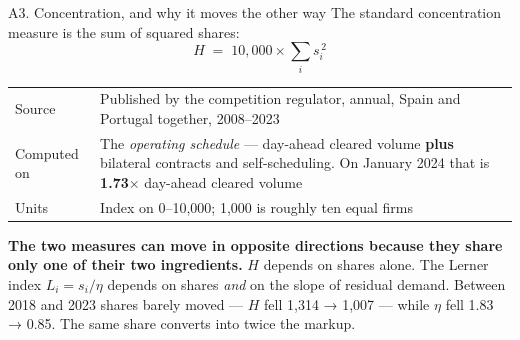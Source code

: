\documentclass[9pt,aspectratio=169]{beamer}
\makeatletter
\newcommand{\designtable}[2]{%
  \small
  \begin{tabularx}{\textwidth}{@{}>{\raggedright\arraybackslash}p{#1}X@{}}
  \toprule
  #2
  \bottomrule
  \end{tabularx}%
}
\makeatother
\begin{document}
\begin{frame}{A3. Concentration, and why it moves the other way}
  \small
  The standard concentration measure is the sum of squared shares:
  \[
    H \;=\; 10{,}000 \times \sum_i s_i^{\,2}
  \]
  \vspace{-0.6em}
  \designtable{}{
    Source & Published by the competition regulator, annual, Spain and
    Portugal together, 2008--2023 \\
    Computed on & The \emph{operating schedule} --- day-ahead cleared volume
    \textbf{plus} bilateral contracts and self-scheduling. On January 2024
    that is \textbf{1.73$\times$} day-ahead cleared volume \\
    Units & Index on 0--10,000; 1,000 is roughly ten equal firms \\
  }

  \vspace{0.8em}
  \textbf{The two measures can move in opposite directions because they share
  only one of their two ingredients.} $H$ depends on shares alone. The Lerner
  index $L_i = s_i / \eta$ depends on shares \emph{and} on the slope of
  residual demand. Between 2018 and 2023 shares barely moved --- $H$ fell
  1,314 → 1,007 --- while $\eta$ fell 1.83 → 0.85. The same share converts
  into twice the markup.
\end{frame}
\end{document}

